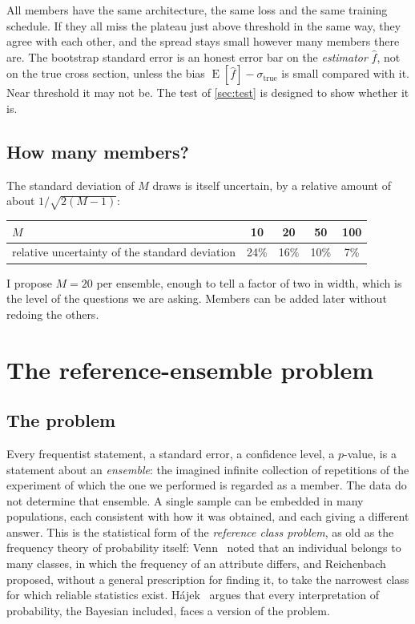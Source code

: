 \documentclass[11pt]{article}
\begin{document}
\begin{watch}
All members have the same architecture, the same loss and the same training schedule. If
they all miss the plateau just above threshold in the same way, they agree with each
other, and the spread stays small however many members there are. The bootstrap standard
error is an honest error bar on the \emph{estimator} $\hat f$, not on the true cross
section, unless the bias $\operatorname{E}[\hat f] - \sigma_\text{true}$ is small compared
with it. Near threshold it may not be. The test of \cref{sec:test} is designed to show
whether it is.
\end{watch}

\subsection{How many members?}

The standard deviation of $M$ draws is itself uncertain, by a relative amount of about
$1/\sqrt{2(M - 1)}$:

\begin{center}
\small
\begin{tabular}{lcccc}
\toprule
$M$ & 10 & 20 & 50 & 100\\
\midrule
relative uncertainty of the standard deviation & 24\% & 16\% & 10\% & 7\%\\
\bottomrule
\end{tabular}
\end{center}

\noindent I propose $M = 20$ per ensemble, enough to tell a factor of two in width, which
is the level of the questions we are asking. Members can be added later without redoing
the others.

\section{The reference-ensemble problem}
\label{sec:reference}

\subsection{The problem}

Every frequentist statement, a standard error, a confidence level, a $p$-value, is a
statement about an \emph{ensemble}: the imagined infinite collection of repetitions of
the experiment of which the one we performed is regarded as a member. The data do not
determine that ensemble. A single sample can be embedded in many populations, each
consistent with how it was obtained, and each giving a different answer. This is the
statistical form of the \emph{reference class problem}, as old as the frequency theory
of probability itself: Venn~\cite{venn1866} noted that an individual belongs to many
classes, in which the frequency of an attribute differs, and Reichenbach~\cite{reichenbach1949}
proposed, without a general prescription for finding it, to take the narrowest class for
which reliable statistics exist. H\'ajek~\cite{hajek2007} argues that every
interpretation of probability, the Bayesian included, faces a version of the problem.
\end{document}
